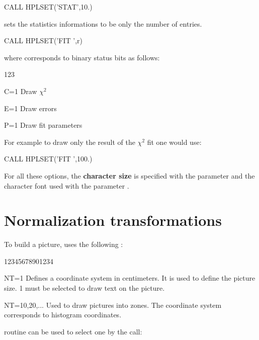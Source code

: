 \begin{XMP}
      CALL HPLSET('STAT',10.)
\end{XMP}
sets the statistics informations to be only the number of entries.
\begin{XMP}
      CALL HPLSET('FIT ',r)
\end{XMP}
where  corresponds to binary status bits  as follows:
\begin{DLtt}{123}
\item[C=1] Draw \(\chi^2\)
\item[E=1] Draw errors
\item[P=1] Draw fit parameters
\end{DLtt}
For example to draw only the result of the \(\chi^2\) fit one would use:
\begin{XMP}
      CALL HPLSET('FIT ',100.)
\end{XMP}
For all these options, the {\bf character size} is specified with the 
 parameter  and the character font used with 
the parameter .

\section{Normalization transformations}

To build a picture, \HPLOT{} uses the following \NTs:
\begin{DLtt}{12345678901234}
\item[NT=1]         Defines a coordinate system in centimeters. It is used to 
                    define the picture size. \NT{} 1 must be selected to draw 
                    text on the picture.
\item[NT=10,20,...] Used to draw pictures into zones. The coordinate system 
                    corresponds to histogram coordinates.
\end{DLtt}
\HIGZ{} routine  can be used to select one \NT{} by the call:
\begin{center}
\end{center}

\bigskip

